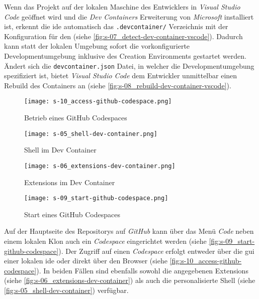 Wenn das Projekt auf der lokalen Maschine des Entwicklers in \textit{Visual Studio Code} geöffnet wird und die \textit{Dev Containers} Erweiterung von \textit{Microsoft} installiert ist, erkennt die \Gls{ide} automatisch das \texttt{.devcontainer/} Verzeichnis mit der Konfiguration für den  (siehe \autoref{fig:s-07_detect-dev-container-vscode}). Dadurch kann statt der lokalen Umgebung sofort die vorkonfigurierte Developmentumgebung inklusive des Creation Environments gestartet werden. Ändert sich die \texttt{devcontainer.json} Datei, in welcher die Developmentumgebung spezifiziert ist, bietet \textit{Visual Studio Code} dem Entwickler unmittelbar einen Rebuild des Containers an (siehe \autoref{fig:s-08_rebuild-dev-container-vscode}).

\begin{figure}[h]
    \centering
    \texttt{[image: s-10\_access-github-codespace.png]}
    \caption{Betrieb eines GitHub Codespaces}
    \label{fig:s-10_access-github-codespace}
\end{figure}

\begin{wrapfigure}{r}{0.49\textwidth}
    \vspace{-10pt}
    \centering
    \texttt{[image: s-05\_shell-dev-container.png]}
    \caption{Shell im Dev Container}
    \label{fig:s-05_shell-dev-container}

    \vspace{05pt}
    
    \texttt{[image: s-06\_extensions-dev-container.png]}
    \caption{Extensions im Dev Container}
    \label{fig:s-06_extensions-dev-container}
    \vspace{-05pt}
\end{wrapfigure}

\begin{figure}
    \begin{minipage}[t]{0.49\textwidth}
        \centering
        \texttt{[image: s-09\_start-github-codespace.png]}
        \caption{Start eines GitHub Codespaces}
        \label{fig:s-09_start-github-codespace}
    \end{minipage}
\end{figure}

Auf der Hauptseite des Repositorys auf \textit{GitHub} kann über das Menü \textit{Code} neben einem lokalen Klon auch ein \textit{Codespace} eingerichtet werden (siehe \autoref{fig:s-09_start-github-codespace}). Der Zugriff auf einen \textit{Codespace} erfolgt entweder über die \Gls{gui} einer lokalen \Gls{ide} oder direkt über den Browser (siehe \autoref{fig:s-10_access-github-codespace}). In beiden Fällen sind ebenfalls sowohl die angegebenen Extensions (siehe \autoref{fig:s-06_extensions-dev-container}) als auch die personalisierte Shell (siehe \autoref{fig:s-05_shell-dev-container}) verfügbar.

